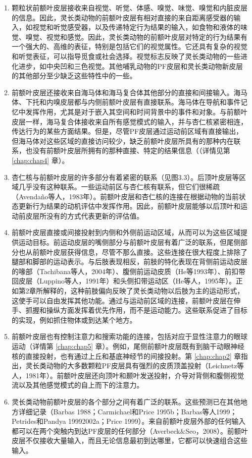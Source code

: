 \begin{enumerate}
\item 颗粒状前额叶皮层接收来自视觉、听觉、体感、嗅觉、味觉、嗅觉和内脏皮层的信息。因此，灵长类动物的前额叶皮层有相对直接的来自距离感受器的输入，如视觉和听觉感受器，以及传递特定行为结果的输入，如食物和液体的味觉、嗅觉、视觉和感觉。因此，灵长类动物的前额叶皮层对特定的行为结果有一个强大的、高维的表征，特别是包括它们的视觉属性。它还具有复杂的视觉和听觉表征，可以指导觅食或社会选择。视觉标志反映了灵长类动物的一些进化进步，如中央凹和三色视觉。其他哺乳动物的PF皮层和灵长类动物新皮层的其他部分至少缺乏这些特性中的一些。

\item 前额叶皮层还接收来自海马体和海马复合体其他部分的直接和间接输入。海马体、下托和内嗅皮层都与内侧前额叶皮层有直接联系。海马体在导航和事件记忆中发挥作用，尤其是对于嵌入其空间和时间背景中的事件和对象。与前额叶皮层一样，海马复合体接收来自所有感觉模式的输入，并与杏仁核紧密相连，传达行为的某些方面结果。但是，尽管PF皮层通过运动前区域有直接输出，但海马体对这些区域的直接访问较少，缺乏前额叶皮层所具有的那种内在联系，也没有前额叶皮层所拥有的那种直接、特定的结果信息（（详情见第 \ref{chap:chap4} 章）。


\item 杏仁核与前额叶皮层的许多部分有着紧密的联系（见图3.3）。后顶叶皮层等区域几乎没有这种联系。一些运动前区与杏仁核有联系，但它们很稀疏（Avendaño等人，1983年）。前额叶皮层和杏仁核的连接在根据动物的当前状态更新行为结果的动机评估中发挥作用。因此，前额叶皮层能够以后顶叶和运动前皮层所没有的方式代表更新的评估值。

\item 前额叶皮层直接或间接投射到内侧和外侧前运动区域，从而可以为这些区域提供运动目标。前运动皮层的嘴侧部分与前额叶皮层有着广泛的联系，但尾侧部分也从前额叶皮层获得信息，尽管不那么直接。这些连接在很大程度上排除了腿部和脚部的运动表示。与后肢表现相反，前肢的特化表现在背侧前运动皮层的喙部（Tachibana等人，2004年）、腹侧前运动皮质（He等1993年）、前扣带回皮层（Luppino等人，1991年）和头侧扣带运动区（He等人，1995年）。正如第2章所解释的，这种前肢偏向反映了灵长类动物以后肢为主的运动形式，这使手可以自由发挥其他功能。通过与运动前区域的连接，前额叶皮层在伸手、抓握和操纵方面发挥着优先作用，而不是运动能力。这些联系促进了目标的实现，例如抓住物体或到达某个地方。

\item 前额叶皮层也有控制注意力和搜索功能的连接，包括对应于显性注意力的眼球运动（详情第 \ref{chap:chap5} 章）。例如，尾侧前额叶皮层既有到脑干动眼神经核的直接投射，也有通过上丘和基底神经节的间接投射。第 \ref{chap:chap2} 章指出，灵长类动物的大多数颗粒PF皮层具有强烈的皮质顶盖投射（Leichnetz等人，1981年）。前额叶皮层还向顶叶和颞叶发送投射，介导对背侧和腹侧视觉流以及其他感觉模式的自上而下的注意力。

\item 灵长类动物前额叶皮层的各个部分之间有着广泛的联系。这些预测已在其他地方详细记录（Barbas 1988；Carmichael和Price 1995b；Barbas等人1999；Petrides和Pandya 19992002a；Price 1999）。来自前额叶皮层外部的任何输入都可以在两个突触内到达PF皮层的任何部分（Averbeck$\&$Seo，2008）。前额叶皮层不仅接收大量输入，而且无论信息最初到达哪里，它都可以快速组合这些输入。
\end{enumerate}
\par


